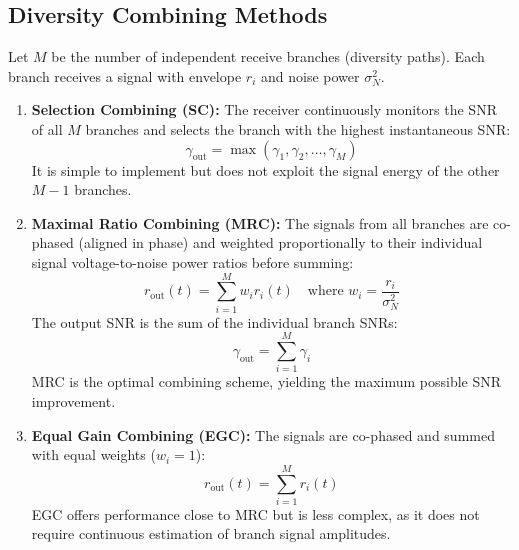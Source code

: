 \documentclass[12pt,a4paper]{article}
\begin{document}
\subsection{Diversity Combining Methods}
Let $M$ be the number of independent receive branches (diversity paths). Each branch receives a signal with envelope $r_i$ and noise power $\sigma_N^2$.
\begin{enumerate}[label=\textbf{\arabic*.}, leftmargin=*, itemsep=4.0pt]
  \item \textbf{Selection Combining (SC):} The receiver continuously monitors the SNR of all $M$ branches and selects the branch with the highest instantaneous SNR:
    \begin{equation}
      \gamma_{\text{out}} = \max(\gamma_1, \gamma_2, \dots, \gamma_M)
    \end{equation}
    It is simple to implement but does not exploit the signal energy of the other $M-1$ branches.
  \item \textbf{Maximal Ratio Combining (MRC):} The signals from all branches are co-phased (aligned in phase) and weighted proportionally to their individual signal voltage-to-noise power ratios before summing:
    \begin{equation}
      r_{\text{out}}(t) = \sum_{i=1}^{M} w_i r_i(t) \quad \text{where } w_i = \frac{r_i}{\sigma_N^2}
    \end{equation}
    The output SNR is the sum of the individual branch SNRs:
    \begin{equation}
      \gamma_{\text{out}} = \sum_{i=1}^{M} \gamma_i
    \end{equation}
    MRC is the optimal combining scheme, yielding the maximum possible SNR improvement.
  \item \textbf{Equal Gain Combining (EGC):} The signals are co-phased and summed with equal weights ($w_i = 1$):
    \begin{equation}
      r_{\text{out}}(t) = \sum_{i=1}^{M} r_i(t)
    \end{equation}
    EGC offers performance close to MRC but is less complex, as it does not require continuous estimation of branch signal amplitudes.
\end{enumerate}
\end{document}
